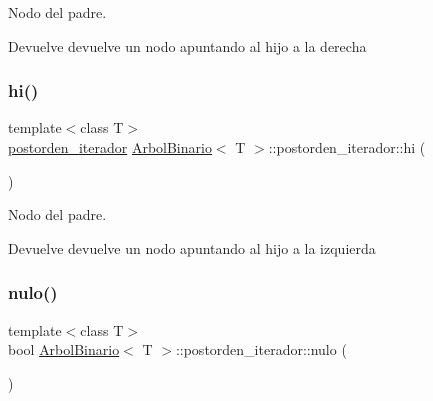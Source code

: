 Nodo del padre. 

\begin{DoxyReturn}{Devuelve}
devuelve un nodo apuntando al hijo a la derecha 
\end{DoxyReturn}
\mbox{\label{classArbolBinario_1_1postorden__iterador_a48a46e7e33e0d385edb9e66b92bac042}} 
\subsubsection{\texorpdfstring{hi()}{hi()}}
{\footnotesize\ttfamily template$<$class T$>$ \\
\hyperlink{classArbolBinario_1_1postorden__iterador}{postorden\+\_\+iterador} \hyperlink{classArbolBinario}{Arbol\+Binario}$<$ T $>$\+::postorden\+\_\+iterador\+::hi (\begin{DoxyParamCaption}{ }\end{DoxyParamCaption})\hspace{0.3cm}{\ttfamily [inline]}}



Nodo del padre. 

\begin{DoxyReturn}{Devuelve}
devuelve un nodo apuntando al hijo a la izquierda 
\end{DoxyReturn}
\mbox{\label{classArbolBinario_1_1postorden__iterador_a27af730213949c932dc3d3b69ac8d756}} 
\subsubsection{\texorpdfstring{nulo()}{nulo()}}
{\footnotesize\ttfamily template$<$class T$>$ \\
bool \hyperlink{classArbolBinario}{Arbol\+Binario}$<$ T $>$\+::postorden\+\_\+iterador\+::nulo (\begin{DoxyParamCaption}{ }\end{DoxyParamCaption})\hspace{0.3cm}{\ttfamily [inline]}}




